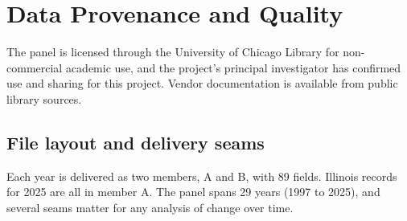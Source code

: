 \documentclass[12pt,letterpaper]{article}
\newif\ifdraft
\newcommand{\TODO}[1]{\ifdraft\textcolor{red}{\textbf{[TODO: #1]}}\fi}
\begin{document}
\TODO{Write last. Do not introduce new evidence. Restate the finding, name the decision it bears on, and be clear about what the analysis cannot settle. Points to carry: historical null and why it does not transfer; our estimates bracket the Administration's \$82 million, near the bottom of the range; static base is the wrong assumption; no peer-reviewed causal evidence on U.S. municipal head taxes; the caveats on the remote-work adjustment (averages, not firm-specific).}

\appendix

\section{Data Provenance and Quality}

\TODO{Licensing and terms.} The panel is licensed through the University of Chicago Library for non-commercial academic use, and the project's principal investigator has confirmed use and sharing for this project. Vendor documentation is available from public library sources.

\subsection*{File layout and delivery seams}

Each year is delivered as two members, A and B, with 89 fields. Illinois records for 2025 are all in member A. The panel spans 29 years (1997 to 2025), and several seams matter for any analysis of change over time.
\end{document}
